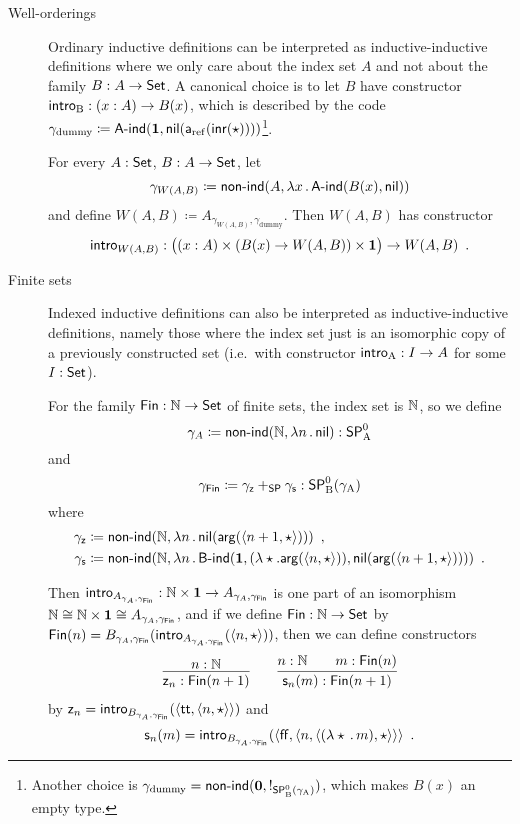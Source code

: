 \documentclass{article}
\begin{document}
\begin{description}
\item[Well-orderings] Ordinary inductive definitions can be
  interpreted as inductive-inductive definitions where we only care
  about the index set $A$ and not about the family $B : A \to \mathsf{Set}$. A
  canonical choice is to let $B$ have constructor $\mathsf{intro}_{\mathrm{B}} : (x : A)
  \to B(x)$, which is described by the code $\gamma_{\text{dummy}}
  \coloneqq \mathsf{A}\text{-}\mathsf{ind}(\mathbf{1},
  \mathsf{nil}(\mathsf{a}_{\mathrm{ref}}(\mathsf{inr}(\star))))$\footnote{Another choice is
    $\gamma_{\text{dummy}} = \mathsf{non}\text{-}\mathsf{ind}(\mathbf{0}, !_{\mathsf{SP}^{0}_{\mathrm{B}}(\gamma_{\mathrm{A}})})$, which makes $B(x)$
    an empty type.}.

  For every $A : \mathsf{Set}$, $B : A \to \mathsf{Set}$, let
  \[
  \gamma_{W(A, B)} \coloneqq \mathsf{non}\text{-}\mathsf{ind}(A, \lambda x\,.\,\mathsf{A}\text{-}\mathsf{ind}(B(x),\mathsf{nil}))
  \]
  and define $W(A, B) \coloneqq A_{\gamma_{W(A, B)},
    \gamma_{\text{dummy}}}$.  Then $W(A, B)$ has constructor
  \[
  \mathsf{intro}_{W(A, B)} : \big((x : A) \times (B(x) \to W(A, B)) \times \mathbf{1}\big) \to W(A, B) \enspace .
  \]

\item[Finite sets] Indexed inductive definitions can also be
  interpreted as inductive-inductive definitions, namely those where
  the index set just is an isomorphic copy of a previously constructed
  set (i.e.\ with constructor $\mathsf{intro}_{\mathrm{A}} : I \to A$ for some $I : \mathsf{Set}$).

  For the family $\mathsf{Fin} : \mathbb{N} \to \mathsf{Set}$ of finite sets, the index set
  is $\mathbb{N}$, so we define
  \[
  \gamma_A \coloneqq \mathsf{non}\text{-}\mathsf{ind}(\mathbb{N}, \lambda n\,.\,\mathsf{nil}) : \mathsf{SP}^{0}_{\mathrm{A}}
  \]
  and
  \[
  \gamma_{\mathsf{Fin}} \coloneqq \gamma_{\mathsf{z}} +_{\mathsf{SP}} \gamma_{\mathsf{s}} : \mathsf{SP}^{0}_{\mathrm{B}}(\gamma_{\mathrm{A}})
  \]
  where
  \begin{align*}
    \gamma_{\mathsf{z}} &\coloneqq \mathsf{non}\text{-}\mathsf{ind}(\mathbb{N}, \lambda n\,.\,\mathsf{nil}(\mathsf{arg}(\langle n + 1 , \star\rangle))) \enspace ,\\
    \gamma_{\mathsf{s}} &\coloneqq \mathsf{non}\text{-}\mathsf{ind}(\mathbb{N}, \lambda n\,.\,\mathsf{B}\text{-}\mathsf{ind}(\mathbf{1}, (\lambda \star . \mathsf{arg}(\langle n , \star\rangle)), \mathsf{nil}(\mathsf{arg}(\langle n + 1 , \star\rangle)))) \enspace .
  \end{align*} 

  Then $\mathsf{intro}_{A_{\gamma_A, \gamma_{\mathsf{Fin}}}} : \mathbb{N} \times \mathbf{1} \to
  A_{\gamma_A, \gamma_{\mathsf{Fin}}}$ is one part of an isomorphism $\mathbb{N}
  \cong \mathbb{N} \times \mathbf{1} \cong A_{\gamma_A, \gamma_{\mathsf{Fin}}}$, and if we
  define $\mathsf{Fin} : \mathbb{N} \to \mathsf{Set}$ by $\mathsf{Fin}(n) = B_{\gamma_A,
    \gamma_{\mathsf{Fin}}}(\mathsf{intro}_{A_{\gamma_A,
    \gamma_{\mathsf{Fin}}}}(\langle n , \star\rangle))$, then we can define
  constructors
  \begin{align*}
    \infer{\finzero{n} : \Fin(n + 1)}{n : \Nat} \qquad
\infer{\finsucc{n}{m} : \Fin(n + 1)}{n : \Nat & \quad m : \Fin(n)}
  \end{align*}
  by $\mathsf{z}_{n} = \mathsf{intro}_{B_{\gamma_A,
      \gamma_{\mathsf{Fin}}}}(\langle \mathsf{tt} , \langle n , \star\rangle\rangle)$ and
  \[
  \mathsf{s}_{n}(m) = \mathsf{intro}_{B_{\gamma_A,
      \gamma_{\mathsf{Fin}}}}(\langle \mathsf{ff} , \langle n , \langle (\lambda
        \star\,.\,m) , \star\rangle\rangle\rangle \enspace .
  \]


\end{description}
\end{document}
